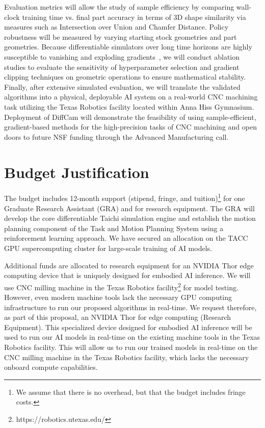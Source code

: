 \documentclass[11pt, letterpaper]{article}
\begin{document}
Evaluation metrics will allow the study of sample efficiency by comparing wall-clock training time vs. final part accuracy in terms of 3D shape similarity via measures such as Intersection over Union and Chamfer Distance.
Policy robustness will be measured by varying starting stock geometries and part geometries.
Because differentiable simulators over long time horizons are highly susceptible to vanishing and exploding gradients~\cite{newbury2024review}, we will conduct ablation studies to evaluate the sensitivity of hyperparameter selection and gradient clipping techniques on geometric operations to ensure mathematical stability.
Finally, after extensive simulated evaluation, we will translate the validated algorithms into a physical, deployable AI system on a real-world CNC machining task utilizing the Texas Robotics
%
%
facility located within Anna Hiss Gymnasium.
Deployment of DiffCam will demonstrate the feasibility of using sample-efficient, gradient-based methods for the high-precision tasks of CNC machining and open doors to future NSF funding through the Advanced Manufacturing call.

\section*{Budget Justification}

The budget includes 12-month support (stipend, fringe, and tuition)\footnote{We assume that there is no overhead, but that the budget includes fringe costs.} for one Graduate Research Assistant (GRA) and for research equipment.
The GRA will develop the core differentiable Taichi simulation engine and establish the motion planning component of the Task and Motion Planning System using a reinforcement learning approach.
We have secured an allocation on the TACC GPU supercomputing cluster for large-scale training of AI models.

Additional funds are allocated to research equipment for an NVIDIA Thor edge computing device that is uniquely designed for embodied AI inference.
We will use CNC milling machine in the Texas Robotics facility\footnote{https://robotics.utexas.edu/} for model testing.
However, even modern machine tools lack the necessary GPU computing infrastructure to run our proposed algorithms in real-time.
We request therefore, as part of this proposal, an NVIDIA Thor for edge computing (Research Equipment).
This specialized device designed for embodied AI inference will be used to run our AI models in real-time on the existing machine tools in the Texas Robotics facility.
This will allow us to run our trained models in real-time on the CNC milling machine in the Texas Robotics facility, which lacks the necessary onboard compute capabilities.
\end{document}
